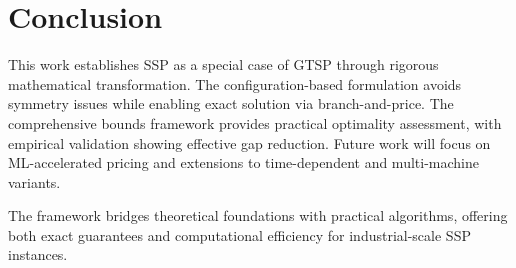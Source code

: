 \documentclass[12pt]{article}
\begin{document}
	\section{Conclusion}
	
	This work establishes SSP as a special case of GTSP through rigorous mathematical transformation. The configuration-based formulation avoids symmetry issues while enabling exact solution via branch-and-price. The comprehensive bounds framework provides practical optimality assessment, with empirical validation showing effective gap reduction. Future work will focus on ML-accelerated pricing and extensions to time-dependent and multi-machine variants.
	
	The framework bridges theoretical foundations with practical algorithms, offering both exact guarantees and computational efficiency for industrial-scale SSP instances.
	
	\newpage
	
	
	
\end{document}
